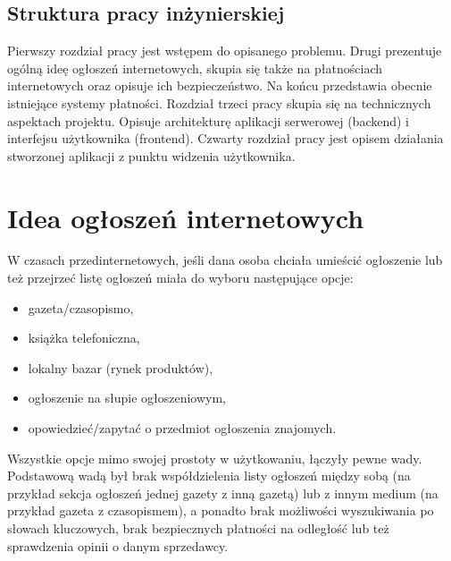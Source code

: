 \documentclass[12pt]{article}
\numberwithin{figure}{section}
\begin{document}
\begin{sloppypar}
\subsection{Struktura pracy inżynierskiej}
Pierwszy rozdział pracy jest wstępem do opisanego problemu. Drugi prezentuje ogólną ideę ogłoszeń internetowych, skupia się także na płatnościach internetowych oraz opisuje ich bezpieczeństwo. Na końcu przedstawia obecnie istniejące systemy płatności. Rozdział trzeci pracy skupia się na technicznych aspektach projektu. Opisuje architekturę aplikacji serwerowej (backend) i interfejsu użytkownika (frontend). Czwarty rozdział pracy jest opisem działania stworzonej aplikacji z punktu widzenia użytkownika. 

\pagebreak
\section{Idea ogłoszeń internetowych}
W czasach przedinternetowych, jeśli dana osoba chciała umieścić ogłoszenie lub też przejrzeć listę ogłoszeń miała do wyboru następujące opcje:
\begin{itemize}
    \item gazeta/czasopismo,
    \item książka telefoniczna,
    \item lokalny bazar (rynek produktów),
    \item ogłoszenie na słupie ogłoszeniowym,
    \item opowiedzieć/zapytać o przedmiot ogłoszenia znajomych.
\end{itemize}

Wszystkie opcje mimo swojej prostoty w użytkowaniu, łączyły pewne wady. Podstawową wadą był brak współdzielenia listy ogłoszeń między sobą (na przykład sekcja ogłoszeń jednej gazety z inną gazetą) lub z innym medium (na przykład gazeta z czasopismem), a ponadto brak możliwości wyszukiwania po słowach kluczowych, brak bezpiecznych płatności na odległość lub też sprawdzenia opinii o danym sprzedawcy.


\end{sloppypar}
\end{document}
